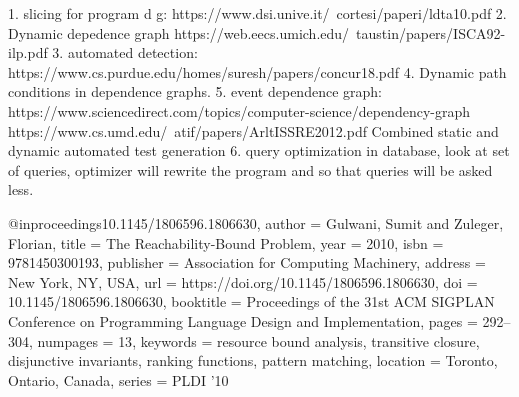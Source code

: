 1. slicing for program d g:
https://www.dsi.unive.it/~cortesi/paperi/ldta10.pdf
2. Dynamic depedence graph https://web.eecs.umich.edu/~taustin/papers/ISCA92-ilp.pdf
3. automated detection:
https://www.cs.purdue.edu/homes/suresh/papers/concur18.pdf
4. Dynamic path conditions in dependence graphs.
5. event dependence graph:
https://www.sciencedirect.com/topics/computer-science/dependency-graph
https://www.cs.umd.edu/~atif/papers/ArltISSRE2012.pdf
Combined static and dynamic automated test generation
6. query optimization in database, look at set of queries, optimizer will rewrite the program and so that queries will be asked less. 

@inproceedings{10.1145/1806596.1806630, 
author = {Gulwani, Sumit and Zuleger, Florian}, 
title = {The Reachability-Bound Problem}, 
year = {2010}, 
isbn = {9781450300193}, 
publisher = {Association for Computing Machinery}, address = {New York, NY, USA}, 
url = {https://doi.org/10.1145/1806596.1806630}, 
doi = {10.1145/1806596.1806630}, 
booktitle = {Proceedings of the 31st ACM SIGPLAN Conference on Programming Language Design and Implementation}, pages = {292–304}, numpages = {13}, keywords = {resource bound analysis, transitive closure, disjunctive invariants, ranking functions, pattern matching}, location = {Toronto, Ontario, Canada}, series = {PLDI '10} }
